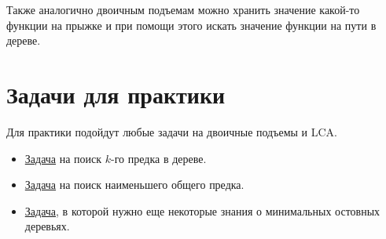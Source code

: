 Также аналогично двоичным подъемам можно хранить значение какой-то функции на прыжке и при помощи этого искать значение функции на пути в дереве.

\section{Задачи для практики}

Для практики подойдут любые задачи на двоичные подъемы и LCA.

\begin{itemize}
 
    \item \href{https://www.hackerrank.com/challenges/kth-ancestor/problem}{Задача} на поиск $k$-го предка в дереве.

    \item \href{https://www.spoj.com/problems/LCA/}{Задача} на поиск наименьшего общего предка.

    \item \href{https://codeforces.com/contest/609/problem/E}{Задача}, в которой нужно еще некоторые знания о минимальных остовных деревьях.

   
\end{itemize}

